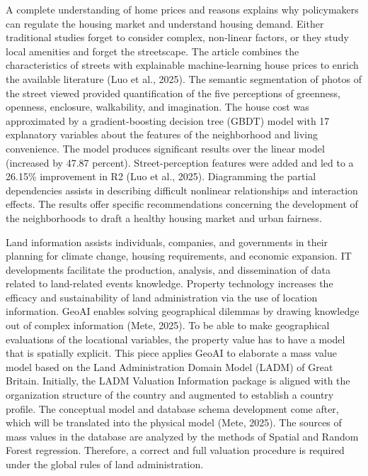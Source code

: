 \documentclass[12pt, a4paper, oneside]{book}
\begin{document}
A complete understanding of home prices and reasons explains why policymakers can regulate the housing market and understand housing demand. Either traditional studies forget to consider complex, non-linear factors, or they study local amenities and forget the streetscape. The article combines the characteristics of streets with explainable machine-learning house prices to enrich the available literature (Luo et al., 2025). The semantic segmentation of photos of the street viewed provided quantification of the five perceptions of greenness, openness, enclosure, walkability, and imagination. The house cost was approximated by a gradient-boosting decision tree (GBDT) model with 17 explanatory variables about the features of the neighborhood and living convenience. The model produces significant results over the linear model (increased by 47.87 percent). Street-perception features were added and led to a 26.15\% improvement in R2 (Luo et al., 2025). Diagramming the partial dependencies assists in describing difficult nonlinear relationships and interaction effects. The results offer specific recommendations concerning the development of the neighborhoods to draft a healthy housing market and urban fairness.


Land information assists individuals, companies, and governments in their planning for climate change, housing requirements, and economic expansion. IT developments facilitate the production, analysis, and dissemination of data related to land-related events knowledge. Property technology increases the efficacy and sustainability of land administration via the use of location information. GeoAI enables solving geographical dilemmas by drawing knowledge out of complex information (Mete, 2025). To be able to make geographical evaluations of the locational variables, the property value has to have a model that is spatially explicit. This piece applies GeoAI to elaborate a mass value model based on the Land Administration Domain Model (LADM) of Great Britain. Initially, the LADM Valuation Information package is aligned with the organization structure of the country and augmented to establish a country profile. The conceptual model and database schema development come after, which will be translated into the physical model (Mete, 2025). The sources of mass values in the database are analyzed by the methods of Spatial and Random Forest regression. Therefore, a correct and full valuation procedure is required under the global rules of land administration.
\end{document}
